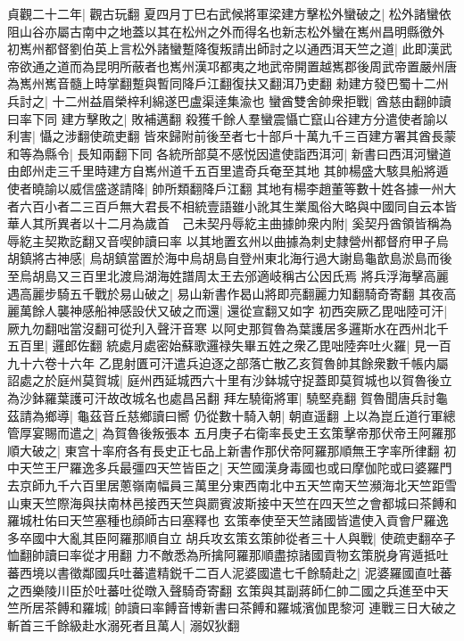 貞觀二十二年|{
	觀古玩翻}
夏四月丁巳右武候將軍梁建方擊松外蠻破之|{
	松外諸蠻依阻山谷亦屬古南中之地蓋以其在松州之外而得名也新志松外蠻在嶲州昌明縣徼外}
初嶲州都督劉伯英上言松外諸蠻蹔降復叛請出師討之以通西洱天竺之道|{
	此即漢武帝欲通之道而為昆明所蔽者也嶲州漢邛都夷之地武帝開置越嶲郡後周武帝置嚴州唐為嶲州嶲音髓上時掌翻蹔與暫同降戶江翻復扶又翻洱乃吏翻}
勑建方發巴蜀十二州兵討之|{
	十二州益眉榮梓利綿遂巴盧渠逹集渝也}
蠻酋雙舍帥衆拒戰|{
	酋慈由翻帥讀曰率下同}
建方擊敗之|{
	敗補邁翻}
殺獲千餘人羣蠻震懾亡竄山谷建方分遣使者諭以利害|{
	懾之涉翻使疏吏翻}
皆來歸附前後至者七十部戶十萬九千三百建方署其酋長蒙和等為縣令|{
	長知兩翻下同}
各統所部莫不感悦因遣使詣西洱河|{
	新書曰西洱河蠻道由郎州走三千里時建方自嶲州道千五百里遣奇兵奄至其地}
其帥楊盛大駭具船將遁使者曉諭以威信盛遂請降|{
	帥所類翻降戶江翻}
其地有楊李趙董等數十姓各據一州大者六百小者二三百戶無大君長不相統壹語雖小訛其生業風俗大略與中國同自云本皆華人其所異者以十二月為歲首　己未契丹辱紇主曲據帥衆内附|{
	奚契丹酋領皆稱為辱紇主契欺訖翻又音喫帥讀曰率}
以其地置玄州以曲據為刺史隸營州都督府甲子烏胡鎮將古神感|{
	烏胡鎮當置於海中烏胡島自登州東北海行過大謝島龜歆島淤島而後至烏胡島又三百里北渡烏湖海姓譜周太王去邠適岐稱古公因氏焉}
將兵浮海擊高麗遇高麗步騎五千戰於易山破之|{
	易山新書作曷山將即亮翻麗力知翻騎奇寄翻}
其夜高麗萬餘人襲神感船神感設伏又破之而還|{
	還從宣翻又如字}
初西突厥乙毘咄陸可汗|{
	厥九勿翻咄當沒翻可從刋入聲汗音寒}
以阿史那賀魯為葉護居多邏斯水在西州北千五百里|{
	邏郎佐翻}
統處月處密始蘇歌邏禄失畢五姓之衆乙毘咄陸奔吐火羅|{
	見一百九十六卷十六年}
乙毘射匱可汗遣兵迫逐之部落亡散乙亥賀魯帥其餘衆數千帳内屬詔處之於庭州莫賀城|{
	庭州西延城西六十里有沙鉢城守捉蓋即莫賀城也以賀魯後立為沙鉢羅葉護可汗故改城名也處昌呂翻}
拜左驍衛將軍|{
	驍堅堯翻}
賀魯聞唐兵討龜茲請為鄉導|{
	龜茲音丘慈鄉讀曰嚮}
仍從數十騎入朝|{
	朝直遥翻}
上以為崑丘道行軍總管厚宴賜而遣之|{
	為賀魯後叛張本}
五月庚子右衛率長史王玄策擊帝那伏帝王阿羅那順大破之|{
	東宫十率府各有長史正七品上新書作那伏帝阿羅那順無王字率所律翻}
初中天竺王尸羅逸多兵最彊四天竺皆臣之|{
	天竺國漢身毒國也或曰摩伽陀或曰婆羅門去京師九千六百里居蔥嶺南幅員三萬里分東西南北中五天竺南天竺瀕海北天竺距雪山東天竺際海與扶南林邑接西天竺與罽賓波斯接中天竺在四天竺之會都城曰茶餺和羅城杜佑曰天竺塞種也顔師古曰塞釋也}
玄策奉使至天竺諸國皆遣使入貢會尸羅逸多卒國中大亂其臣阿羅那順自立胡兵攻玄策玄策帥從者三十人與戰|{
	使疏吏翻卒子恤翻帥讀曰率從才用翻}
力不敵悉為所擒阿羅那順盡掠諸國貢物玄策脱身宵遁抵吐蕃西境以書徵鄰國兵吐蕃遣精鋭千二百人泥婆國遣七千餘騎赴之|{
	泥婆羅國直吐蕃之西樂陵川臣於吐蕃吐從暾入聲騎奇寄翻}
玄策與其副蔣師仁帥二國之兵進至中天竺所居茶餺和羅城|{
	帥讀曰率餺音博新書曰茶餺和羅城濱伽毘黎河}
連戰三日大破之斬首三千餘級赴水溺死者且萬人|{
	溺奴狄翻}
